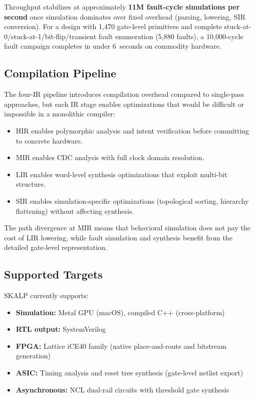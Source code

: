 \documentclass[conference]{IEEEtran}
\begin{document}
Throughput stabilizes at approximately \textbf{11M fault-cycle simulations per second} once simulation dominates over fixed overhead (parsing, lowering, SIR conversion). For a design with 1,470 gate-level primitives and complete stuck-at-0/stuck-at-1/bit-flip/transient fault enumeration (5,880 faults), a 10,000-cycle fault campaign completes in under 6~seconds on commodity hardware.

\subsection{Compilation Pipeline}

The four-IR pipeline introduces compilation overhead compared to single-pass approaches, but each IR stage enables optimizations that would be difficult or impossible in a monolithic compiler:

\begin{itemize}
  \item HIR enables polymorphic analysis and intent verification before committing to concrete hardware.
  \item MIR enables CDC analysis with full clock domain resolution.
  \item LIR enables word-level synthesis optimizations that exploit multi-bit structure.
  \item SIR enables simulation-specific optimizations (topological sorting, hierarchy flattening) without affecting synthesis.
\end{itemize}

The path divergence at MIR means that behavioral simulation does not pay the cost of LIR lowering, while fault simulation and synthesis benefit from the detailed gate-level representation.

\subsection{Supported Targets}

SKALP currently supports:

\begin{itemize}
  \item \textbf{Simulation:} Metal GPU (macOS), compiled C++ (cross-platform)
  \item \textbf{RTL output:} SystemVerilog
  \item \textbf{FPGA:} Lattice iCE40 family (native place-and-route and bitstream generation)
  \item \textbf{ASIC:} Timing analysis and reset tree synthesis (gate-level netlist export)
  \item \textbf{Asynchronous:} NCL dual-rail circuits with threshold gate synthesis
\end{itemize}
\end{document}
